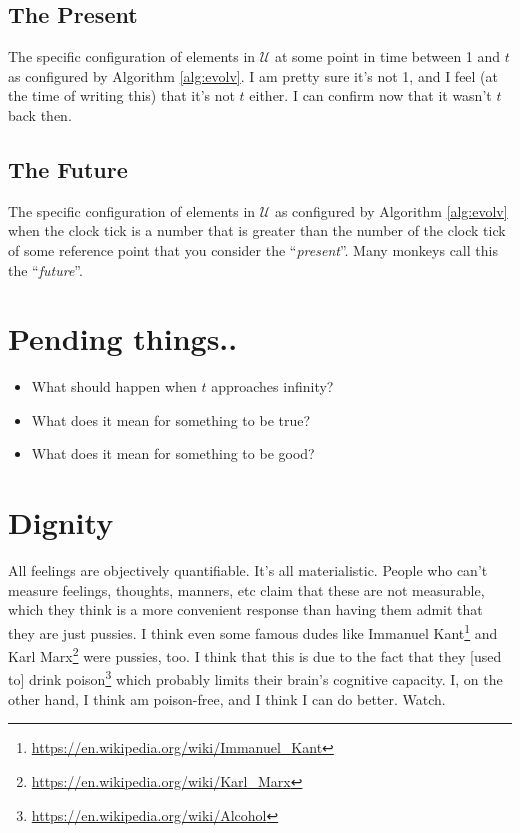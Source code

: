 \documentclass{report}
\begin{document}
\section{The Present}
The specific configuration of elements in $\mathcal{U}$ at some point in time between 1
and $t$ as configured by Algorithm \ref{alg:evolv}. I am pretty sure it's not 1,
and I feel (at the time of writing this) that it's not $t$ either. I can
confirm now that it wasn't $t$ back then.

\section{The Future}
The specific configuration of elements in $\mathcal{U}$ as configured by Algorithm
\ref{alg:evolv} when the clock tick is a number that is greater than the number
of the clock tick of some reference point that you consider the
``\emph{present}''. Many monkeys call this the ``\emph{future}''.

\chapter{Pending things..}
\begin{itemize}
    \item What should happen when $t$ approaches infinity?
    \item What does it mean for something to be true?
    \item What does it mean for something to be good?
\end{itemize}

\chapter{Dignity}
All feelings are objectively quantifiable. It's all materialistic.
People who can't measure feelings, thoughts, manners, etc claim that these are
not measurable, which they think is a more convenient response than having them
admit that they are just pussies. I think even some famous dudes like Immanuel
Kant\footnote{\url{https://en.wikipedia.org/wiki/Immanuel_Kant}} and Karl
Marx\footnote{\url{https://en.wikipedia.org/wiki/Karl_Marx}} were pussies, too.
I think that this is due to the fact that they [used to] drink
poison\footnote{\url{https://en.wikipedia.org/wiki/Alcohol}} which probably
limits their brain's cognitive capacity. I, on the other hand, I think am
poison-free, and I think I can do better.  Watch.
\end{document}
